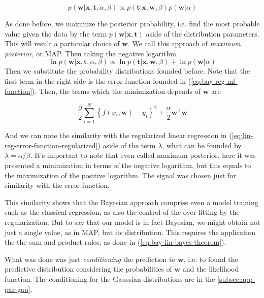 \documentclass[11pt]{article} %
\begin{document}
\begin{equation}
   p(\mathbf{w} | \mathbf{x}, \mathbf{t}, \alpha, \beta) \propto p(\mathbf{t} | \mathbf{x}, \mathbf{w}, \beta) p(\mathbf{w} | \alpha)
\end{equation}

As done before, we maximize the posterior probability, i.e. find the most probable value given the data by the term $p(\mathbf{w} | \mathbf{x}, \mathbf{t}) $ aside of the distribution parameters. This will result a particular choice of $\mathbf{w}$. We call this approach of \textit{maximum posterior}, or MAP. Then taking the negative logarithm
%
\begin{equation}
   \ln p(\mathbf{w} | \mathbf{x}, \mathbf{t}, \alpha, \beta) \propto \ln p(\mathbf{t} | \mathbf{x}, \mathbf{w}, \beta) + \ln p(\mathbf{w} | \alpha)
\end{equation}
%
Then we substitute the probability distributions founded before. Note that the first term in the right side is the error function founded in (\ref{eq:bay-reg-ml-function}). Then, the terms which the minimization depends of $\mathbf{w}$ are

\begin{equation}
    \frac{\beta}{2} \sum_{i=1}^{N}\left\{f\left(x_{i}, \mathbf{w}\right)-y_{i}\right\}^{2} + \frac{\alpha}{2} \mathbf{w}^\top \mathbf{w}
\end{equation}

And we can note the similarity with the regularized linear regression in (\ref{eq:lin-reg-error-function-regularized}) aside of the term $\lambda$, what can be founded by $\lambda=\alpha / \beta$. It's important to note that even called maximum posterior, here it was presented a minimization in terms of the negative logarithm, but this equals to the maximization of the positive logarithm. The signal was chosen just for similarity with the error function.

This similarity shows that the Bayesian approach comprise even a model training such as the classical regression, as also the control of the over fitting by the regularization. But to say that our model is in fact Bayesian, we might obtain not just a single value, as in MAP, but its distribution. This requires the application the the sum and product rules, as done in (\ref{eq:bay-lin-bayes-theorem}).

What was done was just \textit{conditioning} the prediction to $\mathbf{w}$, i.e. to found the predictive distribution considering the probabilities of $\mathbf{w}$ and the likelihood function. The conditioning for the Gaussian distributions are in the \autoref{subsec:app-par-gau}.
\end{document}
